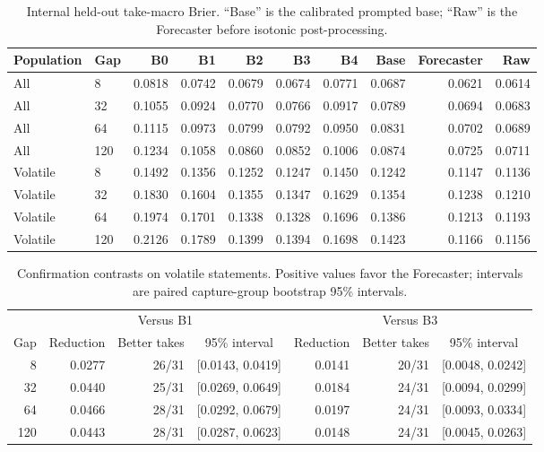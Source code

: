 \documentclass[10pt]{article}
\begin{document}
\begin{table}[h]
\centering
\caption{Internal held-out take-macro Brier. ``Base'' is the calibrated prompted base; ``Raw'' is the Forecaster before isotonic post-processing.}
\label{tab:internal}
\small
\begin{tabular}{llrrrrrrrr}
\toprule
Population & Gap & B0 & B1 & B2 & B3 & B4 & Base & Forecaster & Raw \\
\midrule
All & 8 & 0.0818 & 0.0742 & 0.0679 & 0.0674 & 0.0771 & 0.0687 & 0.0621 & 0.0614 \\
All & 32 & 0.1055 & 0.0924 & 0.0770 & 0.0766 & 0.0917 & 0.0789 & 0.0694 & 0.0683 \\
All & 64 & 0.1115 & 0.0973 & 0.0799 & 0.0792 & 0.0950 & 0.0831 & 0.0702 & 0.0689 \\
All & 120 & 0.1234 & 0.1058 & 0.0860 & 0.0852 & 0.1006 & 0.0874 & 0.0725 & 0.0711 \\
\midrule
Volatile & 8 & 0.1492 & 0.1356 & 0.1252 & 0.1247 & 0.1450 & 0.1242 & 0.1147 & 0.1136 \\
Volatile & 32 & 0.1830 & 0.1604 & 0.1355 & 0.1347 & 0.1629 & 0.1354 & 0.1238 & 0.1210 \\
Volatile & 64 & 0.1974 & 0.1701 & 0.1338 & 0.1328 & 0.1696 & 0.1386 & 0.1213 & 0.1193 \\
Volatile & 120 & 0.2126 & 0.1789 & 0.1399 & 0.1394 & 0.1698 & 0.1423 & 0.1166 & 0.1156 \\
\bottomrule
\end{tabular}
\end{table}

\begin{table}[h]
\centering
\caption{Confirmation contrasts on volatile statements. Positive values favor the Forecaster; intervals are paired capture-group bootstrap 95\% intervals.}
\label{tab:contrasts}
\begin{tabular}{rrrcrrc}
\toprule
& \multicolumn{3}{c}{Versus B1} & \multicolumn{3}{c}{Versus B3} \\
\cmidrule(lr){2-4}\cmidrule(lr){5-7}
Gap & Reduction & Better takes & 95\% interval & Reduction & Better takes & 95\% interval \\
\midrule
8 & 0.0277 & 26/31 & [0.0143, 0.0419] & 0.0141 & 20/31 & [0.0048, 0.0242] \\
32 & 0.0440 & 25/31 & [0.0269, 0.0649] & 0.0184 & 24/31 & [0.0094, 0.0299] \\
64 & 0.0466 & 28/31 & [0.0292, 0.0679] & 0.0197 & 24/31 & [0.0093, 0.0334] \\
120 & 0.0443 & 28/31 & [0.0287, 0.0623] & 0.0148 & 24/31 & [0.0045, 0.0263] \\
\bottomrule
\end{tabular}
\end{table}
\end{document}

